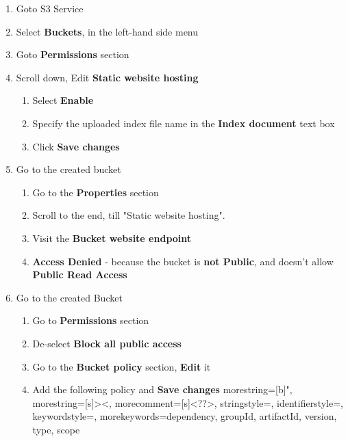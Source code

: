 \begin{enumerate}
  \item Goto S3 Service
  \item Select \textbf{Buckets}, in the left-hand side menu
  \item Goto \textbf{Permissions} section
  \item Scroll down, Edit \textbf{Static website hosting}
        \begin{enumerate}
          \item Select \textbf{Enable}
          \item Specify the uploaded index file name in the \textbf{Index document} text box
          \item Click \textbf{Save changes}
        \end{enumerate}
  \item Go to the created bucket
        \begin{enumerate}
          \item Go to the \textbf{Properties} section
          \item Scroll to the end, till "Static website hosting". 
          \item Visit the \textbf{Bucket website endpoint}
          \item \textbf{Access Denied} - because the bucket is  \textbf{not Public}, and doesn't allow \textbf{Public Read Access}
        \end{enumerate}
  \item Go to the created Bucket
        \begin{enumerate}
            \item Go to \textbf{Permissions} section
            \item De-select \textbf{Block all public access}
          \item Go to the \textbf{Bucket policy} section, \textbf{Edit} it
          \item Add the following policy and \textbf{Save changes}
           \newpage
                {
                  morestring=[b]",
                  morestring=[s]{>}{<},
                  morecomment=[s]{<?}{?>},
                  stringstyle=\color{blue},
                  identifierstyle=\color{magenta},
                  keywordstyle=\color{cyan},
                  morekeywords={dependency, groupId, artifactId, version, type, scope}
                }




\end{enumerate}
\end{enumerate}
